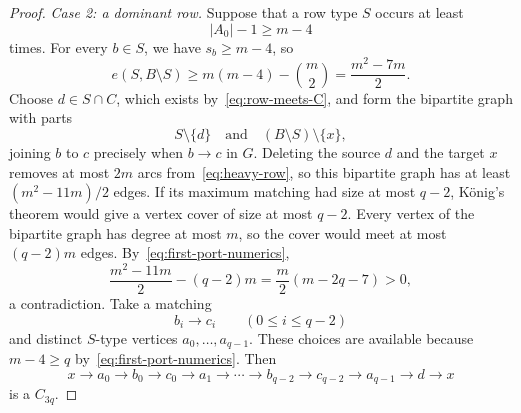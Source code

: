 \documentclass[10pt,a4paper]{amsart}
\begin{document}
\begin{proof}
\smallskip
\noindent\emph{Case 2: a dominant row.}
Suppose that a row type $S$ occurs at least
\[
  |A_0|-1\ge m-4
\]
times.  For every $b\in S$, we have $s_b\ge m-4$, so
\begin{equation}\label{eq:heavy-row}
  e(S,B\setminus S)
  \ge m(m-4)-\binom m2
  =\frac{m^2-7m}{2}.
\end{equation}
Choose $d\in S\cap C$, which exists by~\eqref{eq:row-meets-C}, and
form the bipartite graph with parts
\[
  S\setminus\{d\}
  \quad\text{and}\quad
  (B\setminus S)\setminus\{x\},
\]
joining $b$ to $c$ precisely when $b\to c$ in $G$.  Deleting the
source $d$ and the target $x$ removes at most $2m$ arcs
from~\eqref{eq:heavy-row}, so this bipartite graph has at least
$(m^2-11m)/2$ edges.  If its maximum matching had size at most $q-2$,
K\"onig's theorem would give a vertex cover of size at most $q-2$.
Every vertex of the bipartite graph has degree at most $m$, so the cover
would meet at most $(q-2)m$ edges.  By~\eqref{eq:first-port-numerics},
\[
  \frac{m^2-11m}{2}-(q-2)m
  =\frac m2(m-2q-7)>0,
\]
a contradiction.  Take a matching
\[
  b_i\to c_i\qquad(0\le i\le q-2)
\]
and distinct $S$-type vertices $a_0,\ldots,a_{q-1}$.  These choices are
available because $m-4\ge q$ by~\eqref{eq:first-port-numerics}.  Then
\[
  x\to a_0\to b_0\to c_0\to a_1\to\cdots
  \to b_{q-2}\to c_{q-2}\to a_{q-1}\to d\to x
\]
is a $C_{3q}$.


\end{proof}
\end{document}
